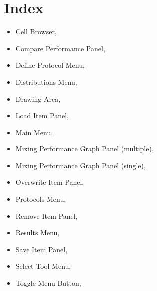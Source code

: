 \chapter{Index}
\begin{itemize}
  \item Cell Browser, \pageref{sec:cellBrows}
  \item Compare Performance Panel, \pageref{sec:compareperf}
  \item Define Protocol Menu, \pageref{sec:defprot}
  \item Distributions Menu, \pageref{sec:distmenu}
  \item Drawing Area, \pageref{sec:drawingarea}
  \item Load Item Panel, \pageref{sec:loaditempanel}
  \item Main Menu, \pageref{sec:mainmenu}
  \item Mixing Performance Graph Panel (multiple), \pageref{sec:mulperfgraph}
  \item Mixing Performance Graph Panel (single), \pageref{sec:singperfgraph}
  \item Overwrite Item Panel, \pageref{sec:overwriteitem}
  \item Protocols Menu, \pageref{sec:protmenu}
  \item Remove Item Panel, \pageref{sec:removeitem}
  \item Results Menu, \pageref{sec:resultsmenu}
  \item Save Item Panel, \pageref{sec:saveitem}
  \item Select Tool Menu, \pageref{sec:selecttoolmenu}
  \item Toggle Menu Button, \pageref{sec:togmenu}
\end{itemize}


